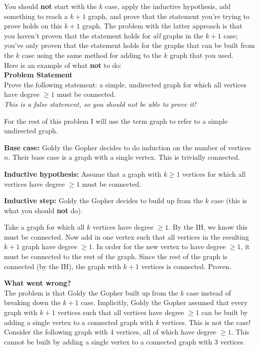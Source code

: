 \documentclass{article}
\theoremstyle{definition}
\begin{document}
You should \textbf{not} start  with the $k$ case, apply the inductive hypothesis, add something to reach a $k+1$ graph, and prove that the statement you're trying to prove holds on this $k+1$ graph. The problem with the latter approach is that you haven't proven that the statement holds for \textit{all} graphs in the $k+1$ case; you've only proven that the statement holds for the graphs that can be built from the $k$ case using the same method for adding to the $k$ graph that you used. \\

Here is an example of what \textbf{not} to do: \\
\textbf{Problem Statement} \\
Prove the following statement: a simple, undirected graph for which all vertices have degree $\geq 1$ must be connected. \\
\textit{This is a false statement, so you should not be able to prove it!}

For the rest of this problem I will use the term graph to refer to a simple undirected graph.

\textbf{Base case:} Goldy the Gopher decides to do induction on the number of vertices $n$. Their base case is a graph with a single vertex. This is trivially connected.

\textbf{Inductive hypothesis:} 
Assume that a graph with $k \geq 1$ vertices for which all vertices have degree $\geq 1$ must be connected. 

\textbf{Inductive step:}
Goldy the Gopher decides to build up from the $k$ case (this is what you should \textbf{not} do).

Take a graph for which all $k$ vertices have degree $\geq 1$. By the IH, we know this must be connected. Now add in one vertex such that all vertices in the resulting $k+1$ graph have degree $\geq 1$. In order for the new vertex to have degree $\geq 1$, it must be connected to the rest of the graph. Since the rest of the graph is connected (by the IH), the graph with $k+1$ vertices is connected. Proven.

\textbf{What went wrong?} \\
The problem is that Goldy the Gopher built up from the $k$ case instead of breaking down the $k+1$ case. Implicitly, Goldy the Gopher assumed that every graph with $k+1$ vertices such that all vertices have degree $\geq 1$ can be built by adding a single vertex to a connected graph with $k$ vertices. This is not the case! Consider the following graph with 4 vertices, all of which have degree $\geq 1$. This cannot be built by adding a single vertex to a connected graph with 3 vertices.
\end{document}

